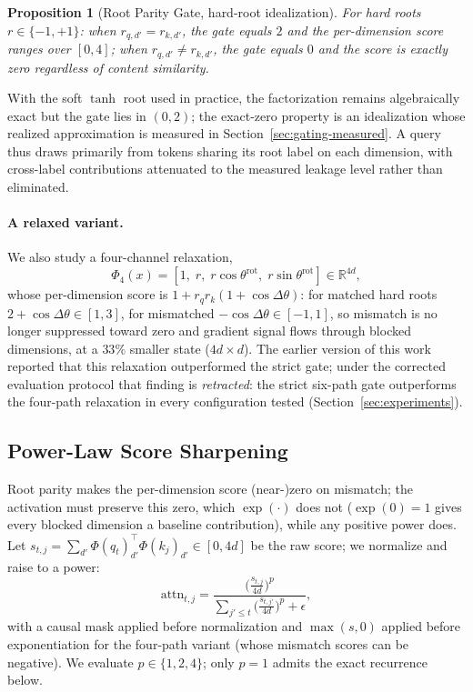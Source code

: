 \documentclass{article}
\newcommand{\R}{\mathbb{R}}
\newtheorem{proposition}[theorem]{Proposition}
\begin{document}
\begin{proposition}[Root Parity Gate, hard-root idealization]
For hard roots $r \in \{-1,+1\}$: when $r_{q,d'} = r_{k,d'}$, the gate equals $2$ and the per-dimension score ranges over $[0, 4]$; when $r_{q,d'} \neq r_{k,d'}$, the gate equals $0$ and the score is exactly zero regardless of content similarity.
\end{proposition}

With the soft $\tanh$ root used in practice, the factorization remains algebraically exact but the gate lies in $(0,2)$; the exact-zero property is an idealization whose realized approximation is measured in Section~\ref{sec:gating-measured}. A query thus draws primarily from tokens sharing its root label on each dimension, with cross-label contributions attenuated to the measured leakage level rather than eliminated.

\paragraph{A relaxed variant.} We also study a four-channel relaxation,
\[
\Phi_4(x) = [1,\; r,\; r\cos\theta^{\text{rot}},\; r\sin\theta^{\text{rot}}] \in \R^{4d},
\]
whose per-dimension score is $1 + r_q r_k(1 + \cos\Delta\theta)$: for matched hard roots $2 + \cos\Delta\theta \in [1,3]$, for mismatched $-\cos\Delta\theta \in [-1,1]$, so mismatch is no longer suppressed toward zero and gradient signal flows through blocked dimensions, at a $33\%$ smaller state ($4d \times d$). The earlier version of this work reported that this relaxation outperformed the strict gate; under the corrected evaluation protocol that finding is \emph{retracted}: the strict six-path gate outperforms the four-path relaxation in every configuration tested (Section~\ref{sec:experiments}).

\subsection{Power-Law Score Sharpening}
\label{sec:power}

Root parity makes the per-dimension score (near-)zero on mismatch; the activation must preserve this zero, which $\exp(\cdot)$ does not ($\exp(0)=1$ gives every blocked dimension a baseline contribution), while any positive power does. Let $s_{t,j} = \sum_{d'} \Phi(q_t)_{d'}^\top \Phi(k_j)_{d'} \in [0, 4d]$ be the raw score; we normalize and raise to a power:
\begin{equation}
\label{eq:powerlaw}
\text{attn}_{t,j} = \frac{\big(\tfrac{s_{t,j}}{4d}\big)^p}{\sum_{j' \leq t} \big(\tfrac{s_{t,j'}}{4d}\big)^p + \epsilon},
\end{equation}
with a causal mask applied before normalization and $\max(s,0)$ applied before exponentiation for the four-path variant (whose mismatch scores can be negative). We evaluate $p \in \{1, 2, 4\}$; only $p=1$ admits the exact recurrence below.
\end{document}
